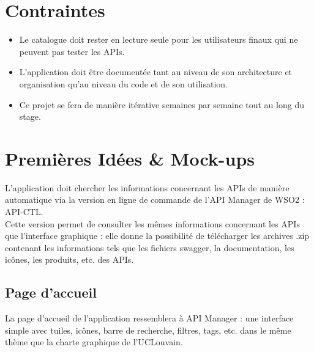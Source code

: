 \section{Contraintes}
\begin{itemize}
    \item[$\bullet$] Le catalogue doit rester en lecture seule pour les utilisateurs finaux qui ne peuvent pas tester les APIs.
    \item[$\bullet$] L'application doit être documentée tant au niveau de son architecture et organisation qu'au niveau du code et de son utilisation.
    \item[$\bullet$] Ce projet se fera de manière itérative semaines par semaine tout au long du stage.
\end{itemize}

\section{Premières Idées \& Mock-ups}
L'application doit chercher les informations concernant les APIs de manière automatique via la version en ligne de commande de l'API Manager de WSO2 : API-CTL.\\
Cette version permet de consulter les mêmes informations concernant les APIs que l'interface graphique : elle donne la possibilité de télécharger les archives .zip contenant les informations tels que les fichiers swagger, la documentation, les icônes, les produits, etc. des APIs.

\subsection{Page d'accueil}
La page d'accueil de l'application ressemblera à API Manager : une interface simple avec tuiles, icônes, barre de recherche, filtres, tags, etc. dans le même thème que la charte graphique de l'UCLouvain.

